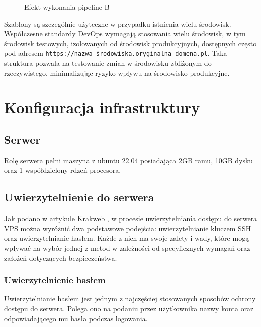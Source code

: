 \documentclass{article}
\begin{document}
\begin{figure}[H]
\begin{minipage}[b]{0.45\textwidth}
        \caption{Efekt wykonania pipeline B}
        \label{fig:enter-label-b}
    \end{minipage}
\end{figure}

Szablony są szczególnie użyteczne w przypadku istnienia wielu środowisk. Współczesne standardy DevOps wymagają stosowania wielu środowisk, w tym środowisk testowych, izolowanych od środowisk produkcyjnych, dostępnych często pod adresem \lstinline|https://nazwa-środowiska.oryginalna-domena.pl|. Taka struktura pozwala na testowanie zmian w środowisku zbliżonym do rzeczywistego, minimalizując ryzyko wpływu na środowisko produkcyjne.

\section{Konfiguracja infrastruktury}

\subsection{Serwer}

Rolę serwera pełni maszyna z ubuntu 22.04 posiadająca 2GB ramu, 10GB dysku oraz 1 współdzielony rdzeń procesora.

\subsection{Uwierzytelnienie do serwera}

Jak podano w artykule Krakweb \cite{Krakweb}, w procesie uwierzytelniania dostępu do serwera VPS można wyróżnić dwa podstawowe podejścia: uwierzytelnianie kluczem SSH oraz uwierzytelnianie hasłem. Każde z nich ma swoje zalety i wady, które mogą wpływać na wybór jednej z metod w zależności od specyficznych wymagań oraz założeń dotyczących bezpieczeństwa.

\subsubsection{Uwierzytelnienie hasłem}

Uwierzytelnianie hasłem jest jednym z najczęściej stosowanych sposobów ochrony dostępu do serwera. Polega ono na podaniu przez użytkownika nazwy konta oraz odpowiadającego mu hasła podczas logowania.
\end{document}
